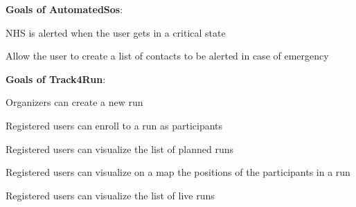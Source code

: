 \begin{goalList}
\begin{enumerate}[label={[}G3.\arabic*{]}]
\end{enumerate}

\textbf{Goals of AutomatedSos}:
\begin{enumerate}[label={[}G4.\arabic*{]}]

\item \label{goal:sos1}NHS is alerted when the user gets in a critical state
\item \label{goal:sos2}Allow the user to create a list of contacts to be alerted  in case of emergency
    
\end{enumerate}
\newpage

\textbf{Goals of Track4Run}:
\begin{enumerate}[label={[}G5.\arabic*{]}]

    \item \label{goal:run1}Organizers can create a new run
    \item \label{goal:run2}Registered users can enroll to a run as participants
    \item \label{goal:run3}Registered users can visualize the list of planned runs
    \item \label{goal:run4}Registered users can visualize on a map the positions of the        participants in a run
    \item\label{goal:run5}Registered users can visualize the list of live runs
    
\end{enumerate}
\end{goalList}
